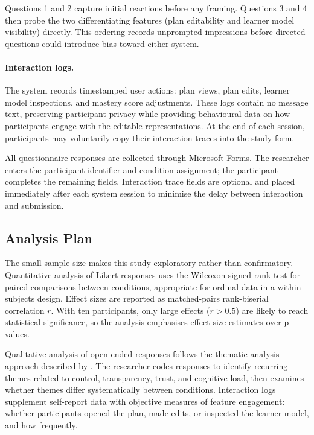 \documentclass[logo,bsc,singlespacing,parskip,online]{infthesis}
\begin{document}
Questions 1 and 2 capture initial reactions before any framing. Questions 3 and 4 then probe the two differentiating features (plan editability and learner model visibility) directly. This ordering records unprompted impressions before directed questions could introduce bias toward either system.

\paragraph{Interaction logs.} The system records timestamped user actions: plan views, plan edits, learner model inspections, and mastery score adjustments. These logs contain no message text, preserving participant privacy while providing behavioural data on how participants engage with the editable representations. At the end of each session, participants may voluntarily copy their interaction traces into the study form.

All questionnaire responses are collected through Microsoft Forms. The researcher enters the participant identifier and condition assignment; the participant completes the remaining fields. Interaction trace fields are optional and placed immediately after each system session to minimise the delay between interaction and submission.

\subsection{Analysis Plan}

The small sample size makes this study exploratory rather than confirmatory. Quantitative analysis of Likert responses uses the Wilcoxon signed-rank test \citep{wilcoxon1945individual} for paired comparisons between conditions, appropriate for ordinal data in a within-subjects design. Effect sizes are reported as matched-pairs rank-biserial correlation $r$. With ten participants, only large effects ($r > 0.5$) are likely to reach statistical significance, so the analysis emphasises effect size estimates over p-values.

Qualitative analysis of open-ended responses follows the thematic analysis approach described by \citet{braun2006thematic}. The researcher codes responses to identify recurring themes related to control, transparency, trust, and cognitive load, then examines whether themes differ systematically between conditions. Interaction logs supplement self-report data with objective measures of feature engagement: whether participants opened the plan, made edits, or inspected the learner model, and how frequently.
\end{document}
